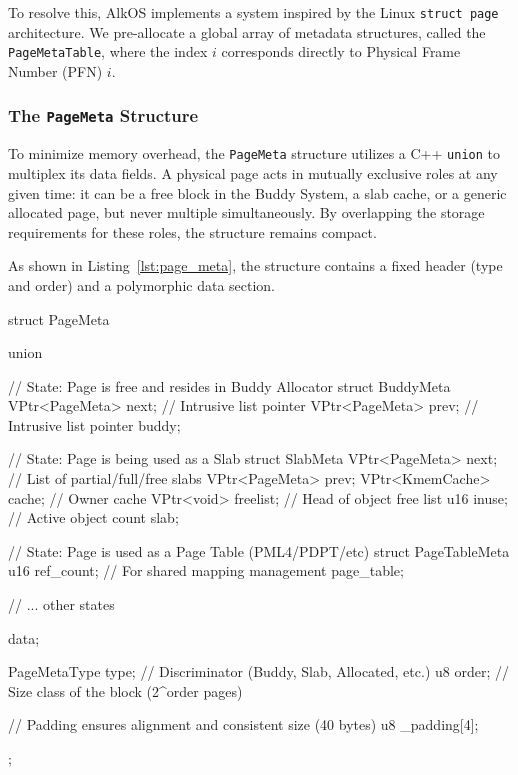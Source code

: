 \documentclass[a4paper,10pt,twoside]{report}
\theoremstyle{definition}
\begin{document}
To resolve this, AlkOS implements a system inspired by the Linux \texttt{struct page} architecture. We pre-allocate a global array of metadata structures, called the \texttt{PageMetaTable}, where the index $i$ corresponds directly to Physical Frame Number (PFN) $i$.

\subsubsection{The \texttt{PageMeta} Structure}

To minimize memory overhead, the \texttt{PageMeta} structure utilizes a C++ \texttt{union} to multiplex its data fields. A physical page acts in mutually exclusive roles at any given time: it can be a free block in the Buddy System, a slab cache, or a generic allocated page, but never multiple simultaneously. By overlapping the storage requirements for these roles, the structure remains compact.

As shown in Listing~\ref{lst:page_meta}, the structure contains a fixed header (type and order) and a polymorphic data section.

\begin{cppcode}[caption={Polymorphic Page Metadata Structure}, label={lst:page_meta}]
struct PageMeta {
    union {
        // State: Page is free and resides in Buddy Allocator
        struct BuddyMeta {
            VPtr<PageMeta> next; // Intrusive list pointer
            VPtr<PageMeta> prev; // Intrusive list pointer
        } buddy;

        // State: Page is being used as a Slab
        struct SlabMeta {
            VPtr<PageMeta> next; // List of partial/full/free slabs
            VPtr<PageMeta> prev;
            VPtr<KmemCache> cache; // Owner cache
            VPtr<void> freelist;   // Head of object free list
            u16 inuse;             // Active object count
        } slab;

        // State: Page is used as a Page Table (PML4/PDPT/etc)
        struct PageTableMeta {
            u16 ref_count;         // For shared mapping management
        } page_table;
        
        // ... other states
    } data;

    PageMetaType type; // Discriminator (Buddy, Slab, Allocated, etc.)
    u8 order;          // Size class of the block (2^order pages)
    
    // Padding ensures alignment and consistent size (40 bytes)
    u8 _padding[4]; 
};
\end{cppcode}
\end{document}
